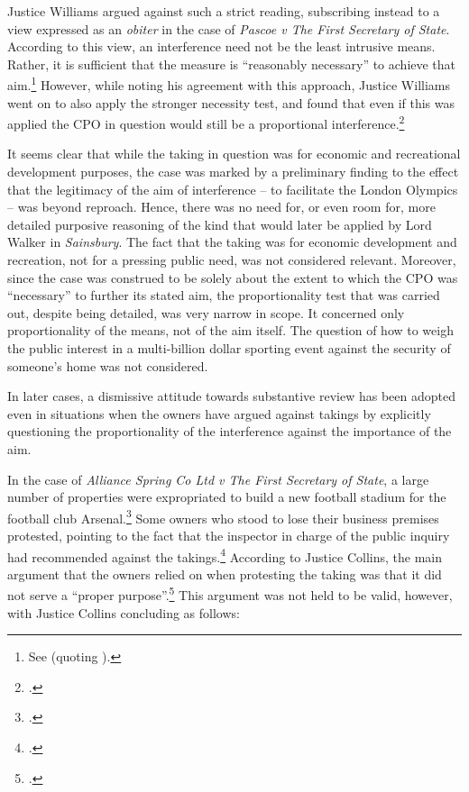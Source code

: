 {Justice Williams argued against such a strict reading, subscribing instead to a view expressed as an {\it obiter} in the case of {\it Pascoe v The First Secretary of State}. According to this view, an interference need not be the least intrusive means. Rather, it is sufficient that the measure is ``reasonably necessary'' to achieve that aim.\footnote{See \cite[74-75]{pascoe06} (quoting \cite[25]{clay04}).} However, while noting his agreement with this approach, Justice Williams went on to also apply the stronger necessity test, and found that even if this was applied the CPO in question would still be a proportional interference.\footcite[41-50]{smith08}

It seems clear that while the taking in question was for economic and recreational development purposes, the case was marked by a preliminary finding to the effect that the legitimacy of the aim of interference -- to facilitate the London Olympics -- was beyond reproach. Hence, there was no need for, or even room for, more detailed purposive reasoning of the kind that would later be applied by Lord Walker in {\it Sainsbury}. The fact that the taking was for economic development and recreation, not for a pressing public need, was not considered relevant. Moreover, since the case was construed to be solely about the extent to which the CPO was ``necessary'' to further its stated aim, the proportionality test that was carried out, despite being detailed, was very narrow in scope. It concerned only proportionality of the means, not of the aim itself. The question of how to weigh the public interest in a multi-billion dollar sporting event against the security of someone's home was not considered.

In later cases, a dismissive attitude towards substantive review has been adopted even in situations when the owners have argued against takings by explicitly questioning the proportionality of the interference against the importance of the aim. 


In the case of {\it Alliance Spring Co Ltd v The First Secretary of State}, a large number of properties were expropriated to build a new football stadium for the football club Arsenal.\footcite{alliance06} Some owners who stood to lose their business premises protested, pointing to the fact that the inspector in charge of the public inquiry had recommended against the takings.\footcite[6-7]{alliance06} According to Justice Collins, the main argument that the owners relied on when protesting the taking was that it did not serve a ``proper purpose''.\footcite[19]{alliance06} This argument was not held to be valid, however, with Justice Collins concluding as follows: 

}
